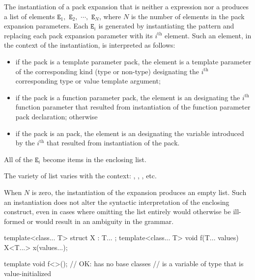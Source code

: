 \pnum
The instantiation of a pack expansion
that is neither a  expression
nor a 
produces a
list of elements
$\mathtt{E}_1,$ $\mathtt{E}_2,$ $\cdots,$ $\mathtt{E}_N$,
where
$N$ is the number of elements in the pack expansion parameters. Each
$\mathtt{E}_i$ is generated by instantiating the pattern and
replacing each pack expansion parameter with its $i^\text{th}$ element.
Such an element, in the context of the instantiation, is interpreted as
follows:

\begin{itemize}
\item
if the pack is a template parameter pack, the element is a template
parameter of the corresponding kind (type or
non-type) designating the $i^\text{th}$
corresponding type or value template argument;

\item
if the pack is a function parameter pack, the element is an
designating the $i^\text{th}$ function parameter
that resulted from instantiation of
the function parameter pack declaration;
otherwise

\item
if the pack is an  pack,
the element is an 
designating the variable introduced by
the $i^\text{th}$ 
that resulted from instantiation of
the  pack.
\end{itemize}

All of the $\mathtt{E}_i$ become items in the enclosing list.
\begin{note} The variety of list varies with the context:
,
,
, etc.\end{note}
When $N$ is zero, the instantiation of the expansion produces an empty list.
Such an instantiation does not alter the syntactic interpretation of the
enclosing construct, even in cases where omitting the list entirely would
otherwise be ill-formed or would result in an ambiguity in the grammar.
\begin{example}
\begin{codeblock}
template<class... T> struct X : T... { };
template<class... T> void f(T... values) {
  X<T...> x(values...);
}

template void f<>();    // OK:  has no base classes
                        //  is a variable of type  that is value-initialized
\end{codeblock}
\end{example}

